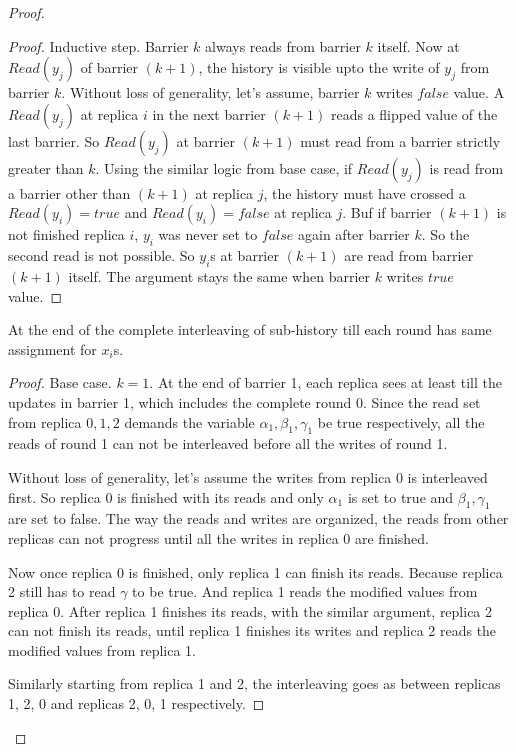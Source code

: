 \begin{proof}
\begin{proof}
    Inductive step. Barrier $k$ always reads from barrier $k$ itself. Now at $Read(y_j)$ of barrier $(k+1)$, the history is visible upto the write of $y_j$ from barrier $k$. Without loss of generality, let's assume, barrier $k$ writes $false$ value. A $Read(y_j)$ at replica $i$ in the next barrier $(k+1)$ reads a flipped value of the last barrier. So $Read(y_j)$ at barrier $(k+1)$ must read from a barrier strictly greater than $k$. Using the similar logic from base case, if $Read(y_j)$ is read from a barrier other than $(k+1)$ at replica $j$, the history must have crossed a $Read(y_i) = true$ and $Read(y_i) = false$ at replica $j$. Buf if barrier $(k+1)$ is not finished replica $i$, $y_i$ was never set to $false$ again after barrier $k$. So the second read is not possible. So $y_i$s at barrier $(k+1)$ are read from barrier $(k+1)$ itself. The argument stays the same when barrier $k$ writes $true$ value.
  \end{proof}

  \begin{lemma}
    \label{crdt:flag:npc-proof:lemma2}
    At the end of the complete interleaving of sub-history till each round has same assignment for $x_i$s.
  \end{lemma}

  \begin{proof}
    Base case. $k = 1$. At the end of barrier 1, each replica sees at least till the updates in barrier 1, which includes the complete round 0.
    Since the read set from replica $0, 1, 2$ demands the variable $\alpha_1, \beta_1, \gamma_1$ be true respectively, all the reads of round 1 can not be interleaved before all the writes of round 1.

    Without loss of generality, let's assume the writes from replica 0 is interleaved first. So replica 0 is finished with its reads and only $\alpha_1$ is set to true and $\beta_1, \gamma_1$ are set to false. The way the reads and writes are organized, the reads from other replicas can not progress until all the writes in replica 0 are finished.

    Now once replica 0 is finished, only replica 1 can finish its reads. Because replica 2 still has to read $\gamma$ to be true. And replica 1 reads the modified values from replica 0. After replica 1 finishes its reads, with the similar argument, replica 2 can not finish its reads, until replica 1 finishes its writes and replica 2 reads the modified values from replica 1.

    Similarly starting from replica 1 and 2, the interleaving goes as between replicas 1, 2, 0 and replicas 2, 0, 1 respectively.


\end{proof}
\end{proof}
